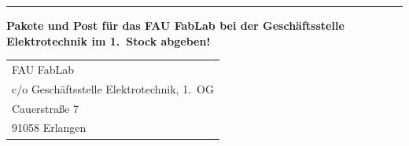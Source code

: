 \documentclass[a5paper]{scrartcl}
\begin{document}
\Schild
\begin{center}
  \Logo{3\SchildText}
\end{center}
{\color{fablab}\rule{\linewidth}{1pt}}

\vspace{\SchildText}
\textbf{Pakete und Post für das FAU FabLab bei der Geschäftsstelle Elektrotechnik
im 1.~Stock abgeben!}

\vfill
\begin{tabular}{@{}l@{}}
  FAU FabLab\\
  c/o Geschäftsstelle Elektrotechnik, 1.~OG\\
  Cauerstraße 7\\
  91058 Erlangen
\end{tabular}
\vfill
\end{document}
